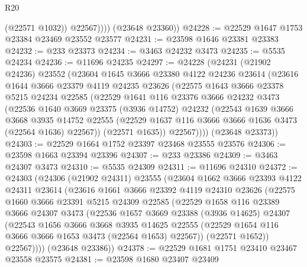\begin{lexlean}{R20}
\begin{coremodule}
                (@22571 @1032))
              @22567))))
      (@23648 @23360))
@24228 := @22529 @1647 @1753 @23384 @23469 @23552 @23577
@24231 := @23598 @1646 @23381 @23383
@24232 := @233 @23373
@24234 := @3463 @24232 @3473
@24235 := @5535 @24234
@24236 := @11696 @24235
@24297 := @24228
    (@24231
      (@21902 @24236)
      @23552
      (@23604
        @1645
        @3666
        @23380
        @4122
        @24236
        @23614
        (@23616
          @1644
          @3666
          @23379
          @4119
          @24235
          @23626
          (@22575
            @1643
            @3666
            @23378
            @5215
            @24234
            @22585
            (@22529
              @1641
              @116
              @23376
              @3666
              @24232
              @3473
              (@22536
                @1640
                @3669
                @23375
                (@3936 @14752)
                @24232
                (@22543
                  @1639
                  @3666
                  @3668
                  @3935
                  @14752
                  @22555
                  (@22529 @1637 @116 @3666 @3666 @1636 @3473 (@22564 @1636) @22567))
                (@22571 @1635))
              @22567))))
      (@23648 @23373))
@24303 := @22529 @1664 @1752 @23397 @23468 @23555 @23576
@24306 := @23598 @1663 @23394 @23396
@24307 := @233 @23386
@24309 := @3463 @24307 @3473
@24310 := @5535 @24309
@24311 := @11696 @24310
@24372 := @24303
    (@24306
      (@21902 @24311)
      @23555
      (@23604
        @1662
        @3666
        @23393
        @4122
        @24311
        @23614
        (@23616
          @1661
          @3666
          @23392
          @4119
          @24310
          @23626
          (@22575
            @1660
            @3666
            @23391
            @5215
            @24309
            @22585
            (@22529
              @1658
              @116
              @23389
              @3666
              @24307
              @3473
              (@22536
                @1657
                @3669
                @23388
                (@3936 @14625)
                @24307
                (@22543
                  @1656
                  @3666
                  @3668
                  @3935
                  @14625
                  @22555
                  (@22529 @1654 @116 @3666 @3666 @1653 @3473 (@22564 @1653) @22567))
                (@22571 @1652))
              @22567))))
      (@23648 @23386))
@24378 := @22529 @1681 @1751 @23410 @23467 @23558 @23575
@24381 := @23598 @1680 @23407 @23409

\end{coremodule}
\end{lexlean}
